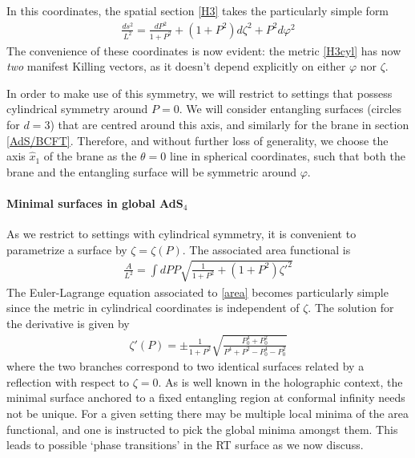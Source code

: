 In this coordinates, the spatial section \eqref{H3} takes the particularly simple form
\begin{align}\label{H3cyl}
\frac{ds^2}{L^2}=\frac{dP^2}{1+P^2}+\left( 1+P^2 \right)d\zeta^2+P^2d\varphi^2
\end{align}
The convenience of these coordinates is now evident: the metric \eqref{H3cyl} has now \textit{two} manifest Killing vectors, as it doesn't depend explicitly on either $\varphi$ nor $\zeta$.

In order to make use of this symmetry, we will restrict to settings that possess cylindrical symmetry around $P=0$. We will consider entangling surfaces (circles for $d=3$) that are centred around this axis, and similarly for the brane in section \ref{AdS/BCFT}. Therefore, and without further loss of generality, we choose the axis $\hat{x}_1$ of the brane as the $\theta=0$ line in spherical coordinates, such that both the brane and the entangling surface will be symmetric around $\varphi$.



\paragraph{Minimal surfaces in global AdS$_4$}

As we restrict to settings with cylindrical symmetry, it is convenient to parametrize a surface by $\zeta=\zeta(P)$. The associated area functional is
\begin{align}\label{area}
\frac{A}{L^2}=\int dP P \sqrt{\frac{1}{1+P^2}+(1+P^2)\zeta'^2}
\end{align}
The Euler-Lagrange equation associated to \eqref{area} becomes particularly simple since the metric in cylindrical coordinates is independent of $\zeta$. The solution for the derivative is given by
\begin{align}\label{zetap}
\zeta'(P)=\pm \frac{1}{1+P^2}\sqrt{\frac{P_0^4+P_0^2}{P^4+P^2-P_0^4-P_0^2}}
\end{align}
where the two branches correspond to two identical surfaces related by a reflection with respect to $\zeta=0$. As is well known in the holographic context, the minimal surface anchored to a fixed entangling region at conformal infinity needs not be unique. For a given setting there may be multiple local minima of the area functional, and one is instructed to pick the global minima amongst them. This leads to possible `phase transitions' in the RT surface as we now discuss.


